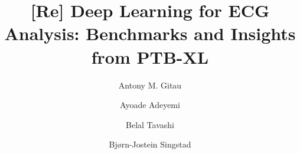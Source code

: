 \def \codeURL{https://github.com/rescience-c/template}
\def \codeDOI{}
\def \dataURL{https://physionet.org/content/ptb-xl/1.0.3/}
\def \dataDOI{10.13026/kfzx-aw45}
\def \editorNAME{}
\def \editorORCID{}
\def \reviewerINAME{}
\def \reviewerIORCID{}
\def \reviewerIINAME{}
\def \reviewerIIORCID{}
\def \dateRECEIVED{}
\def \dateACCEPTED{}
\def \datePUBLISHED{}
\def \articleTITLE{[Re] Deep Learning for ECG Analysis: Benchmarks
and Insights from PTB-XL }
\def \articleTYPE{Replication / Deep Learning for ECG Analysis}
\def \articleDOMAIN{Time series classification}
\def \articleBIBLIOGRAPHY{bibliography.bib}
\def \articleYEAR{2023}
\def \reviewURL{}
\def \articleABSTRACT{}
\def \replicationCITE{}
\def \replicationBIB{}
\def \replicationURL{}
\def \replicationDOI{}
\def \contactNAME{Bjørn-Jostein Singstad}
\def \contactEMAIL{b.j.singstad@fys.uio.no}
\def \articleKEYWORDS{ECG, Time series classification, 1D CNN}
\def \journalNAME{ReScience C}
\def \journalVOLUME{}
\def \journalISSUE{}
\def \articleNUMBER{}
\def \articleDOI{}
\def \authorsFULL{Antony M. Gitau, Ayoade Adeyemi, Belal Tavashi and Bjørn-Jostein Singstad}
\def \authorsABBRV{A.M.Gitau, A.Adeyemi, B.Tavashi \& B.J.Singstad}
\def \authorsSHORT{Gitau, Adeyemi, Tavashi \& Singstad}
\title{\articleTITLE}
\date{}
\author[1,\orcid{0009-0005-6106-3747}]{Antony M. Gitau}
\author[2,3\orcid{0009-0009-8162-394X}]{Ayoade Adeyemi}
\author[4,\orcid{0000-0000-0000-0000}]{Belal Tavashi}
\author[5,6,7,\orcid{0000-0003-4055-4297}]{Bjørn-Jostein Singstad}
